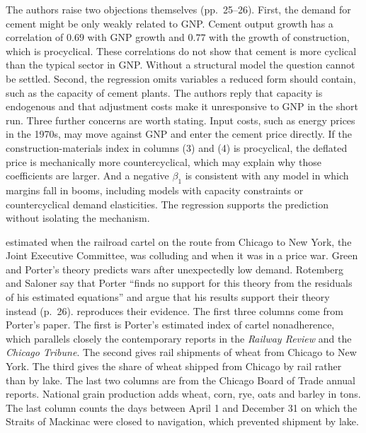 The authors raise two objections themselves (pp.~25--26). First, the demand for cement might be only weakly related
to GNP. Cement output growth has a correlation of $0.69$ with GNP growth and $0.77$ with the growth of construction,
which is procyclical. These correlations do not show that cement is more cyclical than the typical sector in GNP.
Without a structural model the question cannot be settled. Second, the regression omits variables a reduced form
should contain, such as the capacity of cement plants. The authors reply that capacity is endogenous and that
adjustment costs make it unresponsive to GNP in the short run. Three further concerns are worth stating. Input costs,
such as energy prices in the 1970s, may move against GNP and enter the cement price directly. If the
construction-materials index in columns (3) and (4) is procyclical, the deflated price is mechanically more
countercyclical, which may explain why those coefficients are larger. And a negative
$\beta_1$ is consistent with any model in which margins fall in booms, including models with capacity constraints or
countercyclical demand elasticities. The regression supports the prediction without isolating the mechanism.

\citet{Porter1983} estimated when the railroad cartel on the route from Chicago to New York, the Joint Executive
Committee, was colluding and when it was in a price war. Green and Porter's theory predicts wars after unexpectedly low demand.
Rotemberg and Saloner say that Porter ``finds no support for this theory from the residuals of his estimated
equations'' and argue that his results support their theory instead (p.~26).  reproduces
their evidence. The first three columns come from Porter's paper. The first is Porter's estimated index of cartel
nonadherence, which parallels closely the contemporary reports in the \textit{Railway Review} and the
\textit{Chicago Tribune}. The second gives rail shipments of wheat from Chicago to New York. The third gives the share
of wheat shipped from Chicago by rail rather than by lake. The last two columns are from the Chicago Board of Trade
annual reports. National grain production adds wheat, corn, rye, oats and barley in tons. The last column counts the
days between April 1 and December 31 on which the Straits of Mackinac were closed to navigation, which prevented
shipment by lake.

